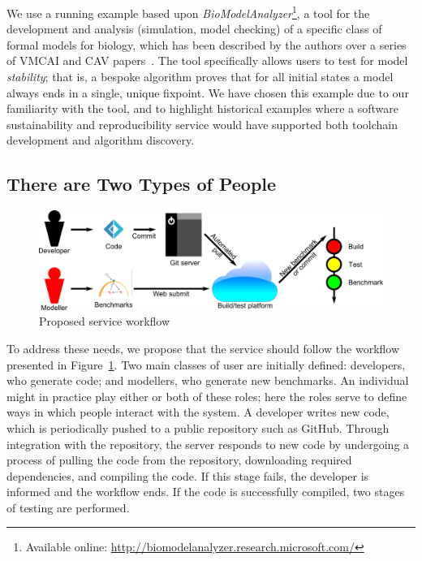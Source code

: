 \documentclass[conference]{IEEEtran}
\begin{document}
We use a running example based upon
{\emph{BioModelAnalyzer}}\footnote{Available online:
\url{http://biomodelanalyzer.research.microsoft.com/}}, a tool for the
development and analysis (simulation, model checking) of a specific
class of formal models for biology, which has been described by the
authors over a series of VMCAI and CAV
papers~\cite{cook-et-al:2011,benque-et-al:2012,cook-et-al:2014}.  The
tool specifically allows users to test for model \emph{stability};
that is, a bespoke algorithm proves that for all initial states a
model always ends in a single, unique fixpoint. We have chosen this
example due to our familiarity with the tool, and to highlight
historical examples where a software sustainability and
reproducibility service would have supported both toolchain
development and algorithm discovery.

\subsection{There are Two Types of People}

\begin{figure}[!htp]
	\centering
	\includegraphics[width=\textwidth]{images/workflow}
	\caption{Proposed service workflow}
	\label{schematic}
\end{figure}

To address these needs, we propose that the service should follow the
workflow presented in Figure~\ref{schematic}. Two main classes of user
are initially defined: developers, who generate code; and modellers,
who generate new benchmarks. An individual might in practice play
either or both of these roles; here the roles serve to define ways in
which people interact with the system. A developer writes new code,
which is periodically pushed to a public repository such as
GitHub. Through integration with the repository, the server responds
to new code by undergoing a process of pulling the code from the
repository, downloading required dependencies, and compiling the
code. If this stage fails, the developer is informed and the workflow
ends. If the code is successfully compiled, two stages of testing are
performed.
\end{document}
